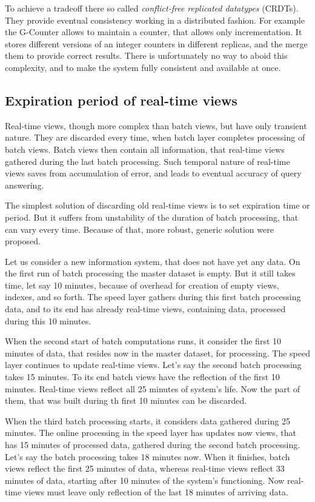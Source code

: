 To achieve a tradeoff there so called \textit{conflict-free replicated datatypes} (CRDTs).
They provide eventual consistency working in a distributed fashion.
For example the G-Counter allows to maintain a counter, that allows only incrementation.
It stores different versions of an integer counters in different replicas, and the merge them to provide correct results.
There is unfortunately no way to aboid this complexity, and to make the system fully consistent and available at once.

\subsection{Expiration period of real-time views}

Real-time views, though more complex than batch views, but have only transient nature.
They are discarded every time, when batch layer completes processing of batch views.
Batch views then contain all information, that real-time views gathered during the last batch processing. 
Such temporal nature of real-time views saves from accumulation of error, and leads to eventual accuracy of query answering.

The simplest solution of discarding old real-time views is to set expiration time or period.
But it suffers from unstability of the duration of batch processing, that can vary every time.
Because of that, more robust, generic solution were proposed.

Let us consider a new information system, that does not have yet any data.
On the first run of batch processing the master dataset is empty.
But it still takes time, let say 10 minutes, because of overhead for creation of empty views, indexes, and so forth.
The speed layer gathers during this first batch processing data, and to its end has already real-time views, containing data, processed during this 10 minutes.

When the second start of batch computations runs, it consider the first 10 minutes of data, that resides now in the master dataset, for processing.
The speed layer continues to update real-time views.
Let's say the second batch processing takes 15 minutes.
To its end batch views have the reflection of the first 10 minutes.
Real-time views reflect all 25 minutes of system's life.
Now the part of them, that was built during th first 10 minutes can be discarded.

When the third batch processing starts, it considers data gathered during 25 minutes.
The online processing in the speed layer has updates now views, that has 15 minutes of processed data, gathered during the second batch processing.
Let's say the batch processing takes 18 minutes now.
When it finishes, batch views reflect the first 25 minutes of data, whereas real-time views reflect 33 minutes of data, starting after 10 minutes of the system's functioning.
Now real-time views must leave only reflection of the last 18 minutes of arriving data.

